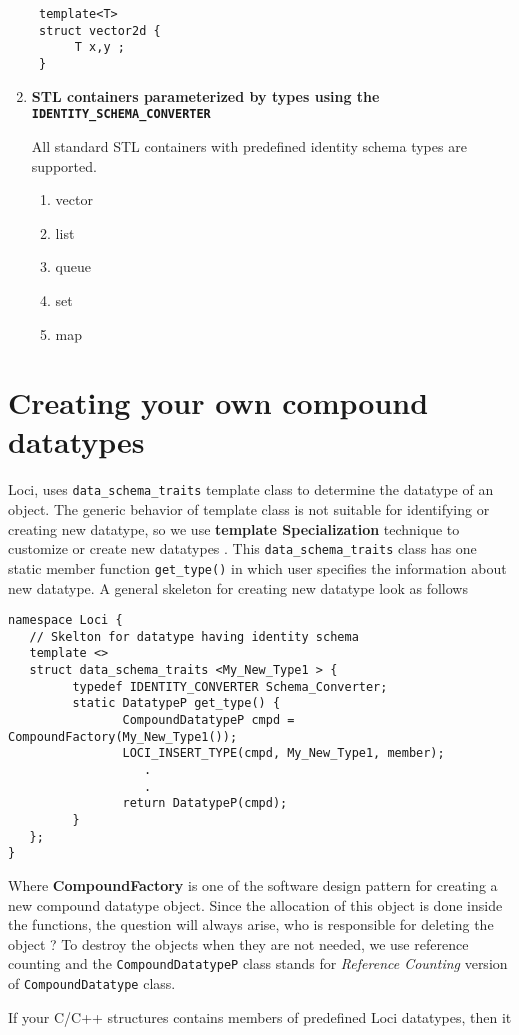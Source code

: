 \begin{enumerate}
\begin{verbatim}
 template<T>
 struct vector2d {
      T x,y ;
 }
\end{verbatim}
\item {\bf STL containers parameterized by types using the {\tt
      IDENTITY\_SCHEMA\_CONVERTER}} 

All standard STL containers with predefined identity schema types are supported.
\begin{enumerate}
\item vector
\item list
\item queue
\item set
\item map
\end{enumerate}
\end{enumerate}
\section {Creating your own compound datatypes}
%
Loci, uses {\tt data\_schema\_traits} template class to determine
the datatype of an object. The generic behavior of template class is
not suitable for identifying or creating new datatype, so we use {\bf
  template Specialization } technique to customize or create new
datatypes . This {\tt data\_schema\_traits} class has one static
member function {\tt get\_type()} in which user specifies the
information about new datatype. A general skeleton for creating new
datatype look as follows
\begin{verbatim}
namespace Loci {
   // Skelton for datatype having identity schema
   template <>
   struct data_schema_traits <My_New_Type1 > {
         typedef IDENTITY_CONVERTER Schema_Converter;
         static DatatypeP get_type() {
                CompoundDatatypeP cmpd = CompoundFactory(My_New_Type1());
                LOCI_INSERT_TYPE(cmpd, My_New_Type1, member);
                   .
                   .
                return DatatypeP(cmpd);
         }
   };
}
\end{verbatim}
%
Where {\bf CompoundFactory} is one of the software design pattern for creating a 
new compound datatype object. Since the allocation of this object is done inside
the functions, the question will always arise, who is responsible for deleting
the object ? To destroy the objects when they are not needed, we use reference counting and the 
{\tt CompoundDatatypeP} class stands for {\em Reference Counting} version of
{\tt CompoundDatatype} class.
%
\par If your C/C++ structures contains members of predefined Loci datatypes, then it
